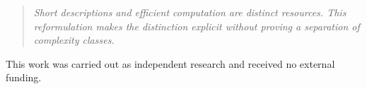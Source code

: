 \documentclass[aps,prd,twocolumn,superscriptaddress,nofootinbib]{revtex4-2}
\theoremstyle{definition}
\theoremstyle{remark}
\begin{document}
\begin{quote}
\textit{Short descriptions and efficient computation are distinct
resources. This reformulation makes the distinction explicit
without proving a separation of complexity classes.}
\end{quote}


\begin{acknowledgments}
This work was carried out as independent research and received no
external funding.
\end{acknowledgments}




\end{document}
